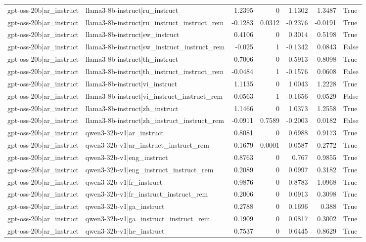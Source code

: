 \begin{table}
\begin{tabular}{l l r r r r l}
gpt-oss-20b|ar_instruct & llama3-8b-instruct|ru_instruct & 1.2395 & 0 & 1.1302 & 1.3487 & True \\
gpt-oss-20b|ar_instruct & llama3-8b-instruct|ru_instruct_instruct_rem & -0.1283 & 0.0312 & -0.2376 & -0.0191 & True \\
gpt-oss-20b|ar_instruct & llama3-8b-instruct|sw_instruct & 0.4106 & 0 & 0.3014 & 0.5198 & True \\
gpt-oss-20b|ar_instruct & llama3-8b-instruct|sw_instruct_instruct_rem & -0.025 & 1 & -0.1342 & 0.0843 & False \\
gpt-oss-20b|ar_instruct & llama3-8b-instruct|th_instruct & 0.7006 & 0 & 0.5913 & 0.8098 & True \\
gpt-oss-20b|ar_instruct & llama3-8b-instruct|th_instruct_instruct_rem & -0.0484 & 1 & -0.1576 & 0.0608 & False \\
gpt-oss-20b|ar_instruct & llama3-8b-instruct|vi_instruct & 1.1135 & 0 & 1.0043 & 1.2228 & True \\
gpt-oss-20b|ar_instruct & llama3-8b-instruct|vi_instruct_instruct_rem & -0.0563 & 1 & -0.1656 & 0.0529 & False \\
gpt-oss-20b|ar_instruct & llama3-8b-instruct|zh_instruct & 1.1466 & 0 & 1.0373 & 1.2558 & True \\
gpt-oss-20b|ar_instruct & llama3-8b-instruct|zh_instruct_instruct_rem & -0.0911 & 0.7589 & -0.2003 & 0.0182 & False \\
gpt-oss-20b|ar_instruct & qwen3-32b-v1|ar_instruct & 0.8081 & 0 & 0.6988 & 0.9173 & True \\
gpt-oss-20b|ar_instruct & qwen3-32b-v1|ar_instruct_instruct_rem & 0.1679 & 0.0001 & 0.0587 & 0.2772 & True \\
gpt-oss-20b|ar_instruct & qwen3-32b-v1|eng_instruct & 0.8763 & 0 & 0.767 & 0.9855 & True \\
gpt-oss-20b|ar_instruct & qwen3-32b-v1|eng_instruct_instruct_rem & 0.2089 & 0 & 0.0997 & 0.3182 & True \\
gpt-oss-20b|ar_instruct & qwen3-32b-v1|fr_instruct & 0.9876 & 0 & 0.8783 & 1.0968 & True \\
gpt-oss-20b|ar_instruct & qwen3-32b-v1|fr_instruct_instruct_rem & 0.2006 & 0 & 0.0913 & 0.3098 & True \\
gpt-oss-20b|ar_instruct & qwen3-32b-v1|ga_instruct & 0.2788 & 0 & 0.1696 & 0.388 & True \\
gpt-oss-20b|ar_instruct & qwen3-32b-v1|ga_instruct_instruct_rem & 0.1909 & 0 & 0.0817 & 0.3002 & True \\
gpt-oss-20b|ar_instruct & qwen3-32b-v1|he_instruct & 0.7537 & 0 & 0.6445 & 0.8629 & True \\

\end{tabular}
\end{table}
